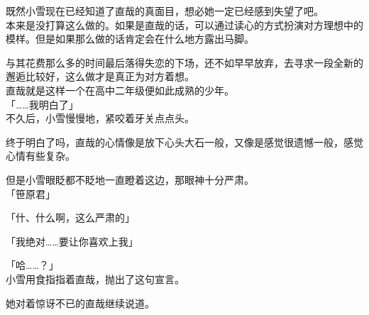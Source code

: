 既然小雪现在已经知道了直哉的真面目，想必她一定已经感到失望了吧。\\

本来是没打算这么做的。如果是直哉的话，可以通过读心的方式扮演对方理想中的模样。但是如果那么做的话肯定会在什么地方露出马脚。

与其花费那么多的时间最后落得失恋的下场，还不如早早放弃，去寻求一段全新的邂逅比较好，这么做才是真正为对方着想。\\

直哉就是这样一个在高中二年级便如此成熟的少年。\\

「……我明白了」\\

不久后，小雪慢慢地，紧咬着牙关点点头。

终于明白了吗，直哉的心情像是放下心头大石一般，又像是感觉很遗憾一般，感觉心情有些复杂。

但是小雪眼眨都不眨地一直瞪着这边，那眼神十分严肃。\\

「笹原君」

「什、什么啊，这么严肃的」

「我绝对……要让你喜欢上我」

「哈……？」\\

小雪用食指指着直哉，抛出了这句宣言。

她对着惊讶不已的直哉继续说道。\\

